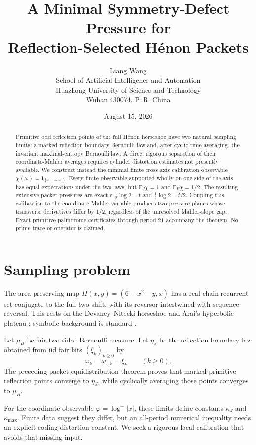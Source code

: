 \documentclass[11pt]{article}
\title{A Minimal Symmetry-Defect Pressure for\\Reflection-Selected H\'enon Packets}
\author{Liang Wang\\\small School of Artificial Intelligence and Automation\\\small Huazhong University of Science and Technology\\\small Wuhan 430074, P. R. China}
\date{August 15, 2026}
\newcommand{\E}{\mathbb E}
\begin{document}
\maketitle
\begin{abstract}
Primitive odd reflection points of the full H\'enon horseshoe have two
natural sampling limits: a marked reflection-boundary Bernoulli law and, after
cyclic time averaging, the invariant maximal-entropy Bernoulli law.  A direct
rigorous separation of their coordinate-Mahler averages requires cylinder
distortion estimates not presently available.  We construct instead the
minimal finite cross-axis calibration observable
$\chi(\omega)=\mathbf1_{\{\omega_{-1}=\omega_1\}}$.  Every finite observable
supported wholly on one side of the axis has equal expectations under the
two laws, but $\E_J\chi=1$ and $\E_B\chi=1/2$.  The resulting extensive packet
pressures are exactly $\frac12\log2-t$ and $\frac12\log2-t/2$.  Coupling this
calibration to the coordinate Mahler variable produces two pressure planes
whose transverse derivatives differ by $1/2$, regardless of the unresolved
Mahler-slope gap.  Exact primitive-palindrome certificates through period
$21$ accompany the theorem.  No prime trace or operator is claimed.
\end{abstract}

\section{Sampling problem}

The area-preserving map $H(x,y)=(6-x^2-y,x)$ has a real chain recurrent set
conjugate to the full two-shift, with its reversor intertwined with sequence
reversal.  This rests on the Devaney--Nitecki horseshoe and Arai's hyperbolic
plateau \cite{DevaneyNitecki1979,Arai2007}; symbolic background is standard
\cite{LindMarcus1995}.

Let $\mu_B$ be fair two-sided Bernoulli measure.  Let $\eta_J$ be the
reflection-boundary law obtained from iid fair bits $(\xi_k)_{k\ge0}$ by
\begin{equation}\label{eq:boundary}
 \omega_k=\omega_{-k}=\xi_k\qquad(k\ge0).
\end{equation}
The preceding packet-equidistribution theorem proves that marked primitive
reflection points converge to $\eta_J$, while cyclically averaging those
points converges to $\mu_B$.

For the coordinate observable $\varphi=\log^+|x|$, these limits define
constants $\kappa_J$ and $\kappa_{\max}$.  Finite data suggest they differ,
but an all-period numerical inequality needs an explicit coding-distortion
constant.  We seek a rigorous local calibration that avoids that missing
input.
\end{document}
